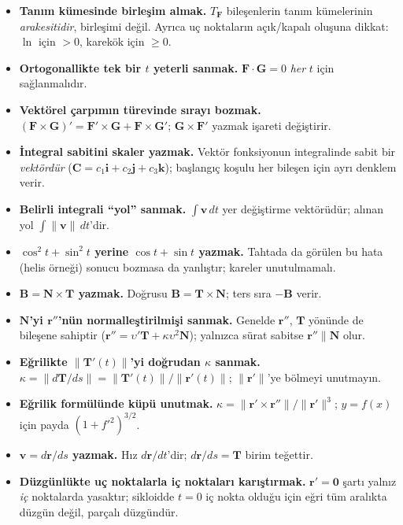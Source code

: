 \begin{dikkat}
\begin{itemize}
\item \textbf{Tanım kümesinde birleşim almak.} $T_{\mathbf F}$ bileşenlerin tanım kümelerinin \emph{arakesitidir}, birleşimi değil.
Ayrıca uç noktaların açık/kapalı oluşuna dikkat: $\ln$ için $>0$, karekök için $\ge0$.
\item \textbf{Ortogonallikte tek bir $t$ yeterli sanmak.} $\mathbf F\cdot\mathbf G=0$ \emph{her} $t$ için sağlanmalıdır.
\item \textbf{Vektörel çarpımın türevinde sırayı bozmak.} $(\mathbf F\times\mathbf G)'=\mathbf F'\times\mathbf G+\mathbf F\times\mathbf G'$;
$\mathbf G\times\mathbf F'$ yazmak işareti değiştirir.
\item \textbf{İntegral sabitini skaler yazmak.} Vektör fonksiyonun integralinde sabit bir \emph{vektördür} ($\mathbf C=c_1\mathbf i+c_2\mathbf j+c_3\mathbf k$);
başlangıç koşulu her bileşen için ayrı denklem verir.
\item \textbf{Belirli integrali ``yol'' sanmak.} $\int\mathbf v\,dt$ yer değiştirme vektörüdür; alınan yol $\int\|\mathbf v\|\,dt$'dir.
\item \textbf{$\cos^2t+\sin^2t$ yerine $\cos t+\sin t$ yazmak.} Tahtada da görülen bu hata (helis örneği) sonucu bozmasa da yanlıştır;
kareler unutulmamalı.
\item \textbf{$\mathbf B=\mathbf N\times\mathbf T$ yazmak.} Doğrusu $\mathbf B=\mathbf T\times\mathbf N$; ters sıra $-\mathbf B$ verir.
\item \textbf{$\mathbf N$'yi $\mathbf r''$'nün normalleştirilmişi sanmak.} Genelde $\mathbf r''$, $\mathbf T$ yönünde de bileşene sahiptir
($\mathbf r''=\upsilon'\mathbf T+\kappa\upsilon^2\mathbf N$); yalnızca sürat sabitse $\mathbf r''\parallel\mathbf N$ olur.
\item \textbf{Eğrilikte $\|\mathbf T'(t)\|$'yi doğrudan $\kappa$ sanmak.} $\kappa=\|d\mathbf T/ds\|=\|\mathbf T'(t)\|/\|\mathbf r'(t)\|$; $\|\mathbf r'\|$'ye bölmeyi unutmayın.
\item \textbf{Eğrilik formülünde küpü unutmak.} $\kappa=\|\mathbf r'\times\mathbf r''\|/\|\mathbf r'\|^{3}$; $y=f(x)$ için payda $(1+f'^2)^{3/2}$.
\item \textbf{$\mathbf v=d\mathbf r/ds$ yazmak.} Hız $d\mathbf r/dt$'dir; $d\mathbf r/ds=\mathbf T$ birim teğettir.
\item \textbf{Düzgünlükte uç noktalarla iç noktaları karıştırmak.} $\mathbf r'=\mathbf 0$ şartı yalnız \emph{iç} noktalarda yasaktır;
sikloidde $t=0$ iç nokta olduğu için eğri tüm aralıkta düzgün değil, parçalı düzgündür.
\end{itemize}
\end{dikkat}

